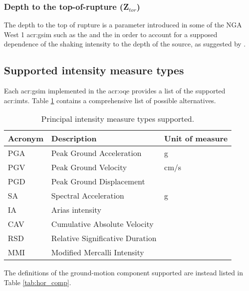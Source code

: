 \subsubsection{Depth to the top-of-rupture (Z$_{tor}$)}
The depth to the top of rupture is a parameter introduced in some of the NGA
West 1 \gls{acr:gsim} such as the \textcite{chiou2008} and the
\textcite{abrahamson2008} in order to account for a supposed dependence
of the shaking intensity to the depth of the source, as suggested by
\textcite{somerville2006a}.
%
\subsection{Supported intensity measure types}
Each \gls{acr:gsim} implemented in the \gls{acr:oqe} provides a list of the 
supported \glspl{acr:imt}. Table \ref{tab:imts} contains a comprehensive list 
of possible alternatives.
\begin{table}[!h]
\centering
\caption{Principal intensity measure types supported.}
\begin{tabular}{|p{3cm}p{5cm}p{3cm}|}
\hline
\rowcolor{anti-flashwhite}
\bf{Acronym} & \bf{Description} & \bf{Unit of measure} \\
\hline 
PGA & Peak Ground Acceleration & g \\
PGV & Peak Ground Velocity     & cm/s \\
PGD & Peak Ground Displacement & \\
SA  & Spectral Acceleration    & g \\
IA  & Arias intensity &  \\
CAV & Cumulative Absolute Velocity &  \\
RSD & Relative Significative Duration \parencite{trifunac1975}&  \\
MMI & Modified Mercalli Intensity &  \\
\hline
\end{tabular}
\label{tab:imts}
\end{table}
The definitions of the ground-motion component supported are instead listed in
Table \ref{tab:hor_comp}. 

